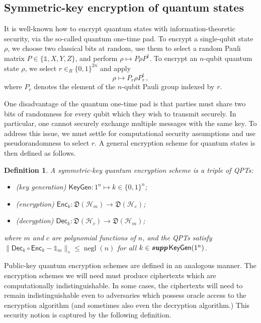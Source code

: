 \documentclass[11pt]{article}
\numberwithin{equation}{section}
\newtheorem{definition}{Definition}
\newcommand{\one}{\mathds 1}
\newcommand{\opn}{\operatorname}
\newcommand{\negl}{\opn{negl}}
\newcommand{\KeyGen}{\ensuremath{\mathsf{KeyGen}}\xspace}
\newcommand{\Enc}{\ensuremath{\mathsf{Enc}}\xspace}
\newcommand{\Dec}{\ensuremath{\mathsf{Dec}}\xspace}
\newcommand{\inrand}{\in_R}
\newcommand{\states}{\mathfrak D}
\newcommand\supp{\textbf{supp}}
\begin{document}
{\subsection{Symmetric-key encryption of quantum states}\label{sec:scheme}

It is well-known how to encrypt quantum states with information-theoretic security, via the so-called quantum one-time pad. To encrypt a single-qubit state $\rho$, we choose two classical bits at random, use them to select a random Pauli matrix $P \in \{\one, X, Y, Z\}$, and perform $\rho \mapsto P \rho P^\dagger$. To encrypt an $n$-qubit quantum state $\rho$, we select $r \inrand \{0,1\}^{2n}$ and apply
\begin{equation}\label{eq:quantum-one-time-pad}
\rho \longmapsto P_r \rho P_r^\dagger\,,
\end{equation}
where $P_r$ denotes the element of the $n$-qubit Pauli group indexed by $r$. 

One disadvantage of the quantum one-time pad is that parties must share two bits of randomness for every qubit which they wish to transmit securely. In particular, one cannot securely exchange multiple messages with the same key. To address this issue, we must settle for computational security assumptions and use pseudorandomness to select $r$. A general encryption scheme for quantum states is then defined as follows.

\begin{definition}\label{def:encryption-scheme}
A symmetric-key quantum encryption scheme is a triple of QPTs:
\begin{itemize}
\item (key generation) $\KeyGen : 1^n \longmapsto k \in \{0, 1\}^n$;
\item (encryption) $\Enc_k : \states (\mathcal H_m) \longrightarrow \states (\mathcal H_c)$;
\item (decryption) $\Dec_k : \states (\mathcal H_c) \longrightarrow \states (\mathcal H_m)$;
\end{itemize}
where $m$ and $c$ are polynomial functions of $n$, and the QPTs satisfy $\| \Dec_k \circ \Enc_k - \one_m \|_\diamond \leq \negl(n)$ for all $k \in \emph{\supp}\,\KeyGen(1^n)$.
\end{definition}

Public-key quantum encryption schemes are defined in an analogous manner. The encryption schemes we will need must produce ciphertexts which are computationally indistinguishable. In some cases, the ciphertexts will need to remain indistinguishable even to adversaries which possess oracle access to the encryption algorithm (and sometimes also even the decryption algorithm.) This security notion is captured by the following definition.

}
\end{document}
